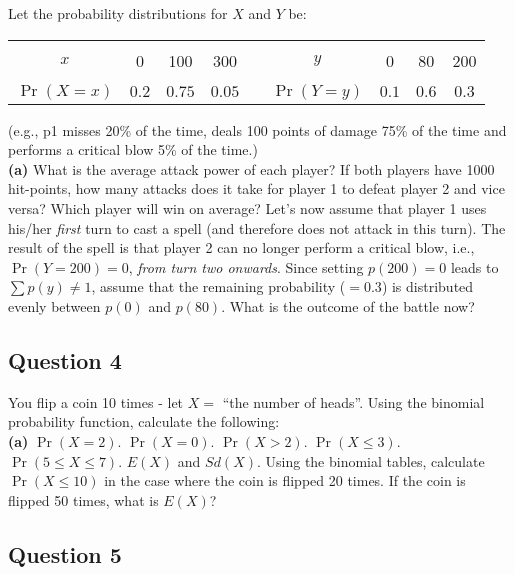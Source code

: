 \documentclass[12pt]{article}
\begin{document}
Let the probability distributions for $X$ and $Y$ be:
\begin{center}
\begin{tabular}{|c|ccc|c|c|ccc|}
\cline{1-4}\cline{6-9}
&&&&&&&&\\[-0.4cm]
$x$ & 0 & 100 & 300 & \qquad\qquad & $y$ & 0 & 80 & 200\\
\cline{1-4}\cline{6-9}
&&&&&&&&\\[-0.4cm]
$\Pr(X=x)$ & $0.2$ & $0.75$ & $0.05$ & & $\Pr(Y=y)$ & $0.1$ & $0.6$ & $0.3$ \\[0.1cm]
\cline{1-4}\cline{6-9}
\end{tabular}
\end{center}
{\footnotesize(e.g., p1 misses 20\% of the time, deals 100 points of damage 75\% of the time and performs a critical blow 5\% of the time.)}\\[-0.2cm]

{\bf(a)} What is the average attack power of each player?  If both players have 1000 hit-points, how many attacks does it take for player 1 to defeat player 2 and vice versa? Which player will win on average?  Let's now assume that player 1 uses his/her \emph{first} turn to cast a spell (and therefore does not attack in this turn). The result of the spell is that player 2 can no longer perform a critical blow, i.e., $\Pr(Y=200) = 0$, \emph{from turn two onwards}. Since setting $p(200) = 0$ leads to $\sum p(y) \ne 1$, assume that the remaining probability ($= 0.3$) is distributed evenly between $p(0)$ and $p(80)$. What is the outcome of the battle now?


\subsection*{Question 4}

You flip a coin 10 times - let $X =$ ``the number of heads''. Using the binomial probability function, calculate the following:\\[-0.2cm]

{\bf(a)} $\Pr(X = 2)$.  $\Pr(X = 0)$.   $\Pr(X > 2)$.  $\Pr(X \le 3)$.  $\Pr(5 \le X \le 7)$.   $E(X)$ and $Sd(X)$.  Using the binomial tables, calculate $\Pr(X \le10)$ in the case where the coin is flipped 20 times.  If the coin is flipped 50 times, what is $E(X)$?

\subsection*{Question 5}
\end{document}
